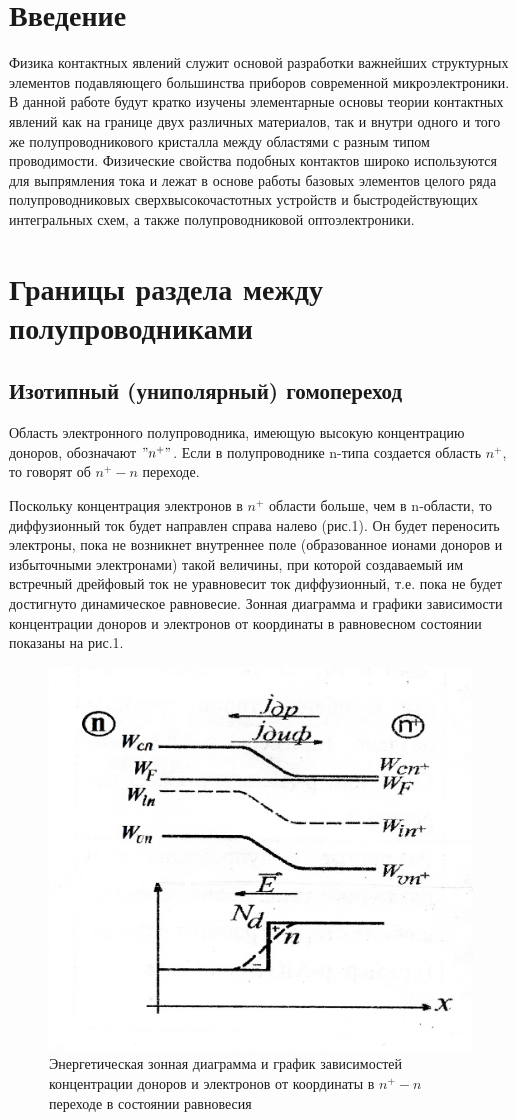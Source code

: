 



\def\labauthors{Карусевич А.А., Шиков А.П.}
\def\labgroup{440}
\def\labnumber{1}
\def\labtheme{Измерение статистических характеристик полупроводникового диода}
\renewcommand{\vec}{\mathbf}
\renewcommand{\phi}{\varphi}
\renewcommand{\hat}{\widehat}



\section{Введение}
Физика контактных явлений служит основой разработки важнейших структурных элементов подавляющего большинства приборов современной микроэлектроники. В данной работе будут кратко изучены элементарные основы теории контактных явлений как на границе двух различных материалов, так и внутри одного и того же полупроводникового кристалла между областями с разным типом проводимости. Физические свойства подобных контактов широко используются для выпрямления тока и лежат в основе работы базовых элементов целого ряда полупроводниковых сверхвысокочастотных устройств и быстродействующих интегральных схем, а также полупроводниковой оптоэлектроники.

\section{Границы раздела между полупроводниками}
\subsection{Изотипный (униполярный) гомопереход}
Область электронного полупроводника, имеющую высокую концентрацию доноров, обозначают $"n^+"$. Если в полупроводнике n-типа создается область $n^+$, то говорят об $n^+-n$ переходе. 

Поскольку концентрация электронов в $n^+$ области больше, чем в n-области, то диффузионный ток будет направлен справа налево (рис.1). Он будет переносить электроны, пока не возникнет внутреннее поле (образованное ионами доноров и избыточными электронами) такой величины, при которой создаваемый им встречный дрейфовый ток не уравновесит ток диффузионный, т.е. пока не будет достигнуто динамическое равновесие. Зонная диаграмма и графики зависимости концентрации доноров и электронов от координаты в равновесном состоянии показаны на рис.1. 
\begin{figure}[h!]
	\centering
	\includegraphics[width=0.35\linewidth]{fig/fig1.jpg}
	\caption{Энергетическая зонная диаграмма и график зависимостей концентрации доноров и электронов от координаты в $n^+-n$ переходе в состоянии равновесия}
	\label{fig:1}
\end{figure}

